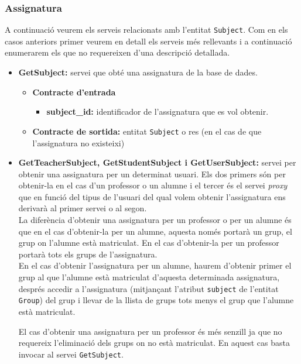 		\subsubsection{Assignatura}
		
		A continuació veurem els serveis relacionats amb l'entitat \texttt{Subject}. Com en els casos anteriors primer veurem en detall els serveis més rellevants i a continuació enumerarem els que no requereixen d'una descripció detallada.
		
		\begin{itemize}
			\item \textbf{GetSubject:} servei que obté una assignatura de la base de dades.
				\begin{itemize}
					\item \textbf{Contracte d'entrada}
						\begin{itemize}
							\item \textbf{subject\_id:} identificador de l'assignatura que es vol obtenir.
						\end{itemize}
					\item \textbf{Contracte de sortida:} entitat \texttt{Subject} o res (en el cas de que l'assignatura no existeixi)
				\end{itemize}
				
			\item \textbf{GetTeacherSubject, GetStudentSubject i GetUserSubject:} servei per obtenir una assignatura per un determinat usuari. Els dos primers són per obtenir-la en el cas d'un professor o un alumne i el tercer és el servei \emph{proxy} que en funció del tipus de l'usuari del qual volem obtenir l'assignatura ens derivarà al primer servei o al segon. \\
			
			La diferència d'obtenir una assignatura per un professor o per un alumne és que en el cas d'obtenir-la per un alumne, aquesta només portarà un grup, el grup on l'alumne està matriculat. En el cas d'obtenir-la per un professor portarà tots els grups de l'assignatura.\\
			
			En el cas d'obtenir l'assignatura per un alumne, haurem d'obtenir primer el grup al que l'alumne està matriculat d'aquesta determinada assignatura, després accedir a l'assignatura (mitjançant l'atribut \texttt{subject} de l'entitat \texttt{Group}) del grup i llevar de la llista de grups tots menys el grup que l'alumne està matriculat.
			
			El cas d'obtenir una assignatura per un professor és més senzill ja que no requereix l'eliminació dels grups on no està matriculat. En aquest cas basta invocar al servei \texttt{GetSubject}.\\
			

\end{itemize}
